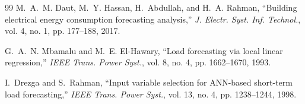 \documentclass[10pt,twocolumn,letterpaper]{article}
\begin{document}
\begin{thebibliography}{99}
M.~A.~M. Daut, M.~Y. Hassan, H.~Abdullah, and H.~A. Rahman, ``Building electrical energy consumption forecasting analysis,'' \emph{J. Electr. Syst. Inf. Technol.}, vol. 4, no. 1, pp. 177--188, 2017.

G.~A.~N. Mbamalu and M.~E. El-Hawary, ``Load forecasting via local linear regression,'' \emph{IEEE Trans. Power Syst.}, vol. 8, no. 4, pp. 1662--1670, 1993.

I.~Drezga and S.~Rahman, ``Input variable selection for ANN-based short-term load forecasting,'' \emph{IEEE Trans. Power Syst.}, vol. 13, no. 4, pp. 1238--1244, 1998.

\end{thebibliography}
\end{document}
